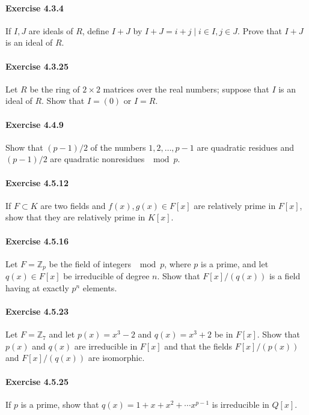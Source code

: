 \documentclass{article}
\begin{document}
\paragraph{Exercise 4.3.4} If $I, J$ are ideals of $R$, define $I + J$ by $I + J = {i + j \mid i \in I, j \in J}$. Prove that $I + J$ is an ideal of $R$.

\paragraph{Exercise 4.3.25} Let $R$ be the ring of $2 \times 2$ matrices over the real numbers; suppose that $I$ is an ideal of $R$. Show that $I = (0)$ or $I = R$.

\paragraph{Exercise 4.4.9} Show that $(p - 1)/2$ of the numbers $1, 2, \ldots, p - 1$ are quadratic residues and $(p - 1)/2$ are quadratic nonresidues $\mod p$.

\paragraph{Exercise 4.5.12} If $F \subset K$ are two fields and $f(x), g(x) \in F[x]$ are relatively prime in $F[x]$, show that they are relatively prime in $K[x]$.

\paragraph{Exercise 4.5.16} Let $F = \mathbb{Z}_p$ be the field of integers $\mod p$, where $p$ is a prime, and let $q(x) \in F[x]$ be irreducible of degree $n$. Show that $F[x]/(q(x))$ is a field having at exactly $p^n$ elements.

\paragraph{Exercise 4.5.23} Let $F = \mathbb{Z}_7$ and let $p(x) = x^3 - 2$ and $q(x) = x^3 + 2$ be in $F[x]$. Show that $p(x)$ and $q(x)$ are irreducible in $F[x]$ and that the fields $F[x]/(p(x))$ and $F[x]/(q(x))$ are isomorphic.

\paragraph{Exercise 4.5.25} If $p$ is a prime, show that $q(x) = 1 + x + x^2 + \cdots x^{p - 1}$ is irreducible in $Q[x]$.
\end{document}
